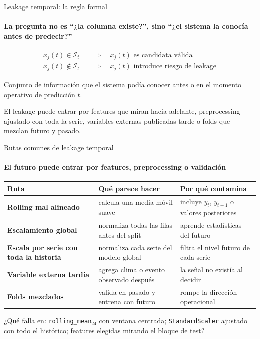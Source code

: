 \documentclass[aspectratio=169,11pt]{beamer}  %
\newcommand{\hrow}{\rowcolor{mlcream}}
\begin{document}
\begin{frame}{Leakage temporal: la regla formal}
\framesubtitle{La pregunta no es ``¿la columna existe?'', sino ``¿el sistema la conocía antes de predecir?''}
\begin{align*}
x_j(t) \in \mathcal{I}_t \quad &\Longrightarrow \quad x_j(t) \text{ es candidata válida}\\[0.4em]
x_j(t) \notin \mathcal{I}_t \quad &\Longrightarrow \quad x_j(t) \text{ introduce riesgo de leakage}
\end{align*}
\begin{defbox}[$\mathcal{I}_t$]
\small Conjunto de información que el sistema podía conocer antes o en el momento operativo de predicción $t$.
\end{defbox}
\small El leakage puede entrar por features que miran hacia adelante, preprocessing ajustado con toda la serie, variables externas publicadas tarde o folds que mezclan futuro y pasado.
\end{frame}

\begin{frame}{Rutas comunes de leakage temporal}
\framesubtitle{El futuro puede entrar por features, preprocessing o validación}
\centering\footnotesize
\begin{tabular}{@{}P{0.25\textwidth} P{0.32\textwidth} P{0.32\textwidth}@{}}
\toprule
\hrow \textbf{Ruta} & Qué parece hacer & Por qué contamina\\
\midrule
\textbf{Rolling mal alineado} & calcula una media móvil suave & incluye $y_t$, $y_{t+1}$ o valores posteriores\\
\textbf{Escalamiento global} & normaliza todas las filas antes del split & aprende estadísticas del futuro\\
\textbf{Escala por serie con toda la historia} & normaliza cada serie del modelo global & filtra el nivel futuro de cada serie\\
\textbf{Variable externa tardía} & agrega clima o evento observado después & la señal no existía al decidir\\
\textbf{Folds mezclados} & valida en pasado y entrena con futuro & rompe la dirección operacional\\
\bottomrule
\end{tabular}
\raggedright
\begin{taskbox}
\footnotesize ¿Qué falla en: \texttt{rolling\_mean}$_{24}$ con ventana centrada; \texttt{StandardScaler} ajustado con todo el histórico; features elegidas mirando el bloque de test?
\end{taskbox}
\end{frame}
\end{document}
